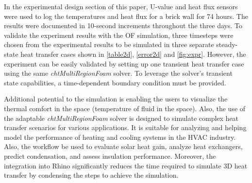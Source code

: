 In the experimental design section of this paper, U-value and heat flux sensors were used to log the temperatures and heat flux for a brick wall for 74 hours. The results were documented in 10-second increments throughout the three days. To validate the experiment results with the OF simulation, three timesteps were chosen from the experimental results to be simulated in three separate steady-state heat transfer cases shown in \ref{table2d}, \ref{error2d} and \ref{fig:expr}. However, the experiment can be easily validated by setting up one transient heat transfer case using the same \textit{chtMultiRegionFoam} solver. To leverage the solver's transient state capabilities, a time-dependent boundary condition must be provided. 



Additional potential to the simulation is enabling the users to visualize the thermal comfort in the space (temperature of fluid in the space). Also, the use of the adaptable \textit{chtMultiRegionFoam} solver is designed to simulate complex heat transfer scenarios for various applications. It is suitable for analyzing and helping model the performance of heating and cooling systems in the HVAC  industry. Also, the workflow be used to evaluate solar heat gain, analyze heat exchangers, predict condensation, and assess insulation performance. Moreover, the integration into
Rhino significantly reduces the time required to simulate 3D heat transfer by condensing the steps to achieve the simulation.



